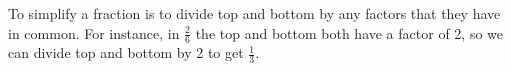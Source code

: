To simplify a fraction is to divide top and bottom by any factors that they
have in common. For instance, in $ \frac{2}{6} $ the top and bottom both have a factor
of 2, so we can divide top and bottom by 2 to get $ \frac{1}{3} . $